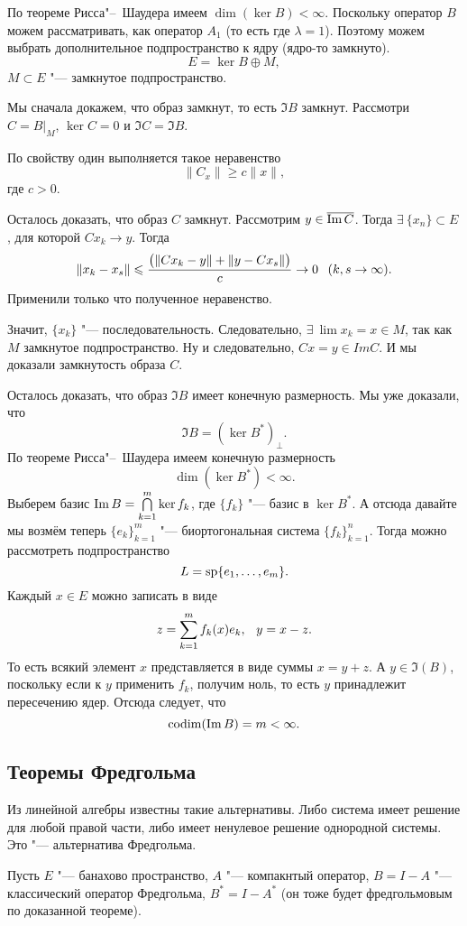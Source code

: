 \begin{Proof}
По теореме Рисса"--~Шаудера имеем $\dim(\ker B)<\infty$. Поскольку оператор $B$ можем рассматривать, как оператор $A_1$ (то есть где $\lambda=1$). Поэтому можем выбрать дополнительное подпространство к ядру (ядро-то замкнуто).
\[
  E = \ker B\oplus M,
\]
$M\subset E$ "--- замкнутое подпространство.

Мы сначала докажем, что образ замкнут, то есть $\Im B$ замкнут. Рассмотри $C = B|_M$, $\ker C=0$ и $\Im C = \Im B$.

По свойству один выполняется такое неравенство
\[
  \|C_x\|\ge c\|x\|,
\]
где $c>0$.


Осталось доказать, что образ $C$ замкнут. Рассмотрим $y\in\ol{\Im C}$. Тогда $\exists\ \{x_n\}\subset E$, для которой $C x_k\to y$. Тогда
\[
  \|x_{k} - x_s\| \le \frac{\big(\|C x_k - y\| + \|y - C x_s\|\big)}c\to 0\pau(k,s\to\infty).
\]
Применили только что полученное неравенство. 

Значит, $\{x_k\}$ "--- последовательность. Следовательно, $\exists\ \lim x_k = x\in M$, так как $M$ замкнутое подпространство. Ну и следовательно, $Cx = y\in Im C$. И мы доказали замкнутость образа $C$.

Осталось доказать, что образ $\Im B$ имеет конечную размерность. Мы уже доказали, что
\[
  \Im B = (\ker B^*)_\perp.
\]
По теореме Рисса"--~Шаудера имеем конечную размерность
\[
  \dim(\ker B^*)<\infty.
\]
Выберем базис $\Im B = \CAP k1m \ker f_k$, где $\{f_k\}$ "--- базис в $\ker B^*$. А отсюда давайте мы возмём теперь $\{e_k\}_{k=1}^m$ "--- биортогональная система $\{f_k\}_{k=1}^n$. Тогда можно рассмотреть подпространство
\[
  L = \sp\{e_1,\dots,e_m\}.
\]
Каждый $x\in E$ можно записать в виде
\[
 z = \RY k1m f_k(x) e_k,\pau y = x - z.
\]
То есть всякий элемент $x$ представляется в виде суммы $x = y+z$. А $y\in \Im (B)$, поскольку если к $y$ применить $f_k$, получим ноль, то есть $y$ принадлежит пересечению ядер. Отсюда следует, что 
\[
 \codim (\Im B) = m<\infty.
\]
\end{Proof}
\subsection{Теоремы Фредгольма}
Из линейной алгебры известны такие альтернативы. Либо система имеет решение для любой правой части, либо имеет ненулевое решение однородной системы. Это "--- альтернатива Фредгольма.

Пусть $E$ "--- банахово пространство, $A$ "--- компакнтый оператор, $B = I- A$ "--- классический оператор Фредгольма, $B^*=  I - A^*$ (он тоже будет фредгольмовым по доказанной теореме).

